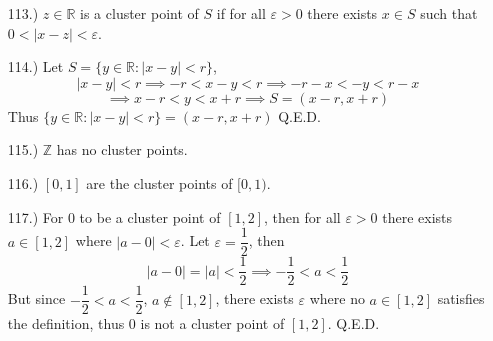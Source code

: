 \documentclass[12pt]{article}
\newcommand{\vertb}[1]{\left\vert#1\right\vert}
\newcommand{\e}{\varepsilon}
\begin{document}
\begin{itemize}












    \item [113.)] $z\in\mathbb{R}$ is a cluster point of $S$ if for all $\varepsilon>0$ there exists $x\in S$ such that $0<\vertb{x-z}<\varepsilon$.

    \item [114.)] Let $S=\{y\in\mathbb{R}:\vertb{x-y}<r\}$,
    \[\vertb{x-y}<r\implies-r<x-y<r\implies -r-x<-y<r-x\]
    \[\implies x-r<y<x+r\implies S=(x-r,x+r)\]
    Thus $\{y\in\mathbb{R}:\vertb{x-y}<r\}=(x-r,x+r)$ Q.E.D.
    
    \item [115.)] $\mathbb{Z}$ has no cluster points.
    
    \item [116.)] $[0,1]$ are the cluster points of $[0,1)$.

    \item [117.)] For $0$ to be a cluster point of $[1,2]$, then for all $\varepsilon>0$ there exists $a\in[1,2]$ where $\vertb{a-0}<\varepsilon$. Let $\varepsilon=\dfrac{1}{2}$, then
    \[\vertb{a-0}=\vertb{a}<\frac{1}{2}\implies -\frac{1}{2}<a<\frac{1}{2}\]
    But since $-\dfrac{1}{2}<a<\dfrac{1}{2}$, $a\notin[1,2]$, there exists $\e$ where no $a\in[1,2]$ satisfies the definition, thus $0$ is not a cluster point of $[1,2]$. Q.E.D.


\end{itemize}
\end{document}
